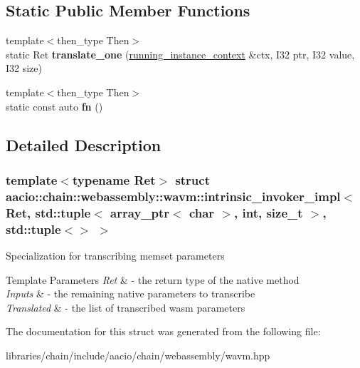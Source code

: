 \subsection*{Static Public Member Functions}
\begin{DoxyCompactItemize}
\item 
\mbox{\label{structaacio_1_1chain_1_1webassembly_1_1wavm_1_1intrinsic__invoker__impl_3_01_ret_00_01std_1_1tup96c14ddb984aab19f252a13225bc9a1f_ae827c58f8c26fff1e2b3b119c671f322}} 
{\footnotesize template$<$then\+\_\+type Then$>$ }\\static Ret {\bfseries translate\+\_\+one} (\mbox{\hyperlink{structaacio_1_1chain_1_1webassembly_1_1wavm_1_1running__instance__context}{running\+\_\+instance\+\_\+context}} \&ctx, I32 ptr, I32 value, I32 size)
\item 
\mbox{\label{structaacio_1_1chain_1_1webassembly_1_1wavm_1_1intrinsic__invoker__impl_3_01_ret_00_01std_1_1tup96c14ddb984aab19f252a13225bc9a1f_a25b8954e801b3651bd1a59439707625f}} 
{\footnotesize template$<$then\+\_\+type Then$>$ }\\static const auto {\bfseries fn} ()
\end{DoxyCompactItemize}


\subsection{Detailed Description}
\subsubsection*{template$<$typename Ret$>$\newline
struct aacio\+::chain\+::webassembly\+::wavm\+::intrinsic\+\_\+invoker\+\_\+impl$<$ Ret, std\+::tuple$<$ array\+\_\+ptr$<$ char $>$, int, size\+\_\+t $>$, std\+::tuple$<$$>$ $>$}

Specialization for transcribing memset parameters


\begin{DoxyTemplParams}{Template Parameters}
{\em Ret} & -\/ the return type of the native method \\
\hline
{\em Inputs} & -\/ the remaining native parameters to transcribe \\
\hline
{\em Translated} & -\/ the list of transcribed wasm parameters \\
\hline
\end{DoxyTemplParams}


The documentation for this struct was generated from the following file\+:\begin{DoxyCompactItemize}
\item 
libraries/chain/include/aacio/chain/webassembly/wavm.\+hpp\end{DoxyCompactItemize}
